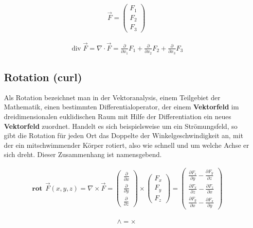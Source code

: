 \documentclass[a4paper]{scrartcl}
\begin{document}
\begin{align}
\vec F = \begin{pmatrix} F_1 \\ F_2 \\ F_3 \end{pmatrix}
\end{align}

\begin{align}
\operatorname{div}\vec F = \nabla \cdot \vec F =
\frac{\partial}{\partial x_1}F_1 + \frac{\partial}{\partial x_2}F_2+ \frac{\partial}{\partial x_3}F_3
\end{align}

\subsection{Rotation (curl)}
Als Rotation bezeichnet man in der Vektoranalysis, einem Teilgebiet der
Mathematik, einen bestimmten Differentialoperator, der einem \textbf{Vektorfeld}
im dreidimensionalen euklidischen Raum mit Hilfe der Differentiation ein neues
\textbf{Vektorfeld} zuordnet. Handelt es sich beispielsweise um ein
Strömungsfeld, so gibt die Rotation für jeden Ort das Doppelte der Winkelgeschwindigkeit an, mit
der ein mitschwimmender Körper rotiert, also wie schnell und um welche Achse er
sich dreht. Dieser Zusammenhang ist namensgebend.

\begin{align}
\mathbf{\operatorname{rot}}\,\vec F(x,y,z) = \nabla\times \vec F =
\begin{pmatrix} \frac{\partial}{\partial x} \\ \frac{\partial}{\partial y} \\
\frac{\partial}{\partial z} \end{pmatrix} \times \begin{pmatrix} F_x\\ F_y\\ F_z
\end{pmatrix} = \begin{pmatrix} \frac{\partial F_z}{\partial y} - \frac{\partial
F_y}{\partial z} \\ \frac{\partial F_x}{\partial z} - \frac{\partial
F_z}{\partial x} \\ \frac{\partial F_y}{\partial x} - \frac{\partial
F_x}{\partial y} \end{pmatrix}
\end{align}

\begin{align}
\mathbf{\wedge = \times}
\end{align}
\end{document}
